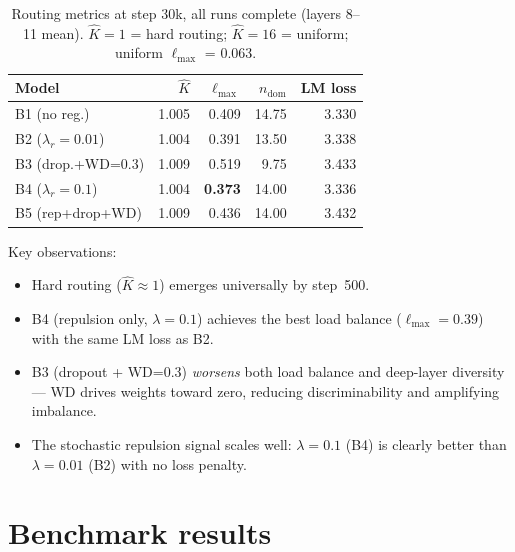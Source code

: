 \documentclass[11pt,a4paper]{article}
\begin{document}
\begin{table}[ht]
\centering
\caption{Routing metrics at step 30k, all runs complete (layers 8--11 mean).
  $\hat{K}{=}1$ = hard routing; $\hat{K}{=}16$ = uniform; uniform $\ell_\text{max}$ = 0.063.}
\label{tab:routing}
\begin{tabular}{lrrrr}
\toprule
Model & $\hat{K}$ & $\ell_\text{max}$ & $n_\text{dom}$ & LM loss \\
\midrule
B1 (no reg.)            & 1.005 & 0.409 & 14.75 & 3.330 \\
B2 ($\lambda_r{=}0.01$) & 1.004 & 0.391 & 13.50 & 3.338 \\
B3 (drop.+WD=0.3)       & 1.009 & 0.519 &  9.75 & 3.433 \\
B4 ($\lambda_r{=}0.1$)  & 1.004 & \textbf{0.373} & 14.00 & 3.336 \\
B5 (rep+drop+WD)        & 1.009 & 0.436 & 14.00 & 3.432 \\
\bottomrule
\end{tabular}
\end{table}

Key observations:
\begin{itemize}
  \item Hard routing ($\hat{K}{\approx}1$) emerges universally by step~500.
  \item B4 (repulsion only, $\lambda{=}0.1$) achieves the best load balance
        ($\ell_\text{max}{=}0.39$) with the same LM loss as B2.
  \item B3 (dropout + WD=0.3) \emph{worsens} both load balance and
        deep-layer diversity --- WD drives weights toward zero, reducing
        discriminability and amplifying imbalance.
  \item The stochastic repulsion signal scales well: $\lambda{=}0.1$
        (B4) is clearly better than $\lambda{=}0.01$ (B2) with no loss penalty.
\end{itemize}

\section{Benchmark results}
\end{document}
